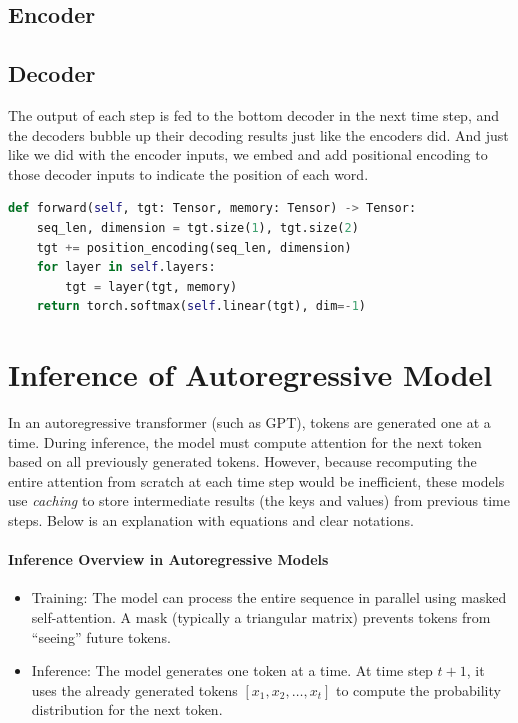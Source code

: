 \subsection{Encoder}

\subsection{Decoder}
The output of each step is fed to the bottom decoder in the next time step, and the decoders bubble up their decoding results just like the encoders did. And just like we did with the encoder inputs, we embed and add positional encoding to those decoder inputs to indicate the position of each word.

\begin{lstlisting}[language=Python]
def forward(self, tgt: Tensor, memory: Tensor) -> Tensor:
	seq_len, dimension = tgt.size(1), tgt.size(2)
	tgt += position_encoding(seq_len, dimension)
	for layer in self.layers:
		tgt = layer(tgt, memory)
	return torch.softmax(self.linear(tgt), dim=-1)
\end{lstlisting}


\section{Inference of Autoregressive Model}

In an autoregressive transformer (such as GPT), tokens are generated one at a time. During inference, the model must compute attention for the next token based on all previously generated tokens. However, because recomputing the entire attention from scratch at each time step would be inefficient, these models use \textit{caching} to store intermediate results (the keys and values) from previous time steps. Below is an explanation with equations and clear notations.

\paragraph{Inference Overview in Autoregressive Models}
\begin{itemize}
	\item Training: The model can process the entire sequence in parallel using masked self-attention. A mask (typically a triangular matrix) prevents tokens from ``seeing'' future tokens.
	\item Inference: The model generates one token at a time. At time step \( t+1 \), it uses the already generated tokens \( [x_1, x_2, \dots, x_t] \) to compute the probability distribution for the next token.
\end{itemize}

